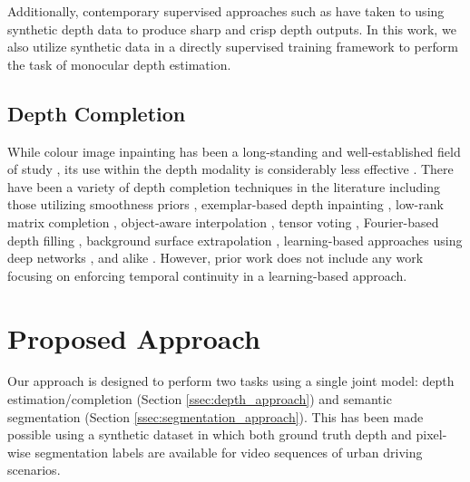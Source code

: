 \documentclass[10pt,twocolumn,letterpaper]{article}
\begin{document}
Additionally, contemporary supervised approaches such as \cite{atapour2018real} have taken to using synthetic depth data to produce sharp and crisp depth outputs. In this work, we also utilize synthetic data \cite{RosCVPR16} in a directly supervised training framework to perform the task of monocular depth estimation.\vspace{-0.15cm}

\subsection{Depth Completion}
\label{ssec:completion_related}\vspace{-0.1cm}

While colour image inpainting has been a long-standing and well-established field of study \cite{bist, breckon12completion, ding2018perceptually, pathak2016context, bistoseh, yeh2017semantic}, its use within the depth modality is considerably less effective \cite{abarghouei18review}. There have been a variety of depth completion techniques in the literature including those utilizing smoothness priors \cite{herrera2013depth}, exemplar-based depth inpainting \cite{atapour2018extended}, low-rank matrix completion \cite{xue2017depth}, object-aware interpolation \cite{abarghouei17depthcomp}, tensor voting \cite{kulkarni2013depth}, Fourier-based depth filling \cite{abarghouei16filling}, background surface extrapolation \cite{matsuo2015depth, muddala2014depth}, learning-based approaches using deep networks \cite{abarghouei19gan, zhang2018deep}, and alike \cite{bertalmio2001navier, chen2014improved, liu2016building}. However, prior work does not include any work focusing on enforcing temporal continuity in a learning-based approach.\vspace{-0.15cm}

\section{Proposed Approach}
\label{sec:approach}\vspace{-0.1cm}

Our approach is designed to perform two tasks using a single joint model: depth estimation/completion (Section \ref{ssec:depth_approach}) and semantic segmentation (Section \ref{ssec:segmentation_approach}). This has been made possible using a synthetic dataset \cite{RosCVPR16} in which both ground truth depth and pixel-wise segmentation labels are available for video sequences of urban driving scenarios.\vspace{-0.1cm}
\end{document}
